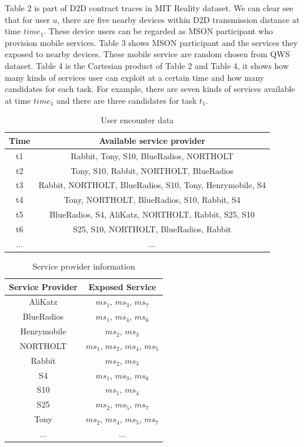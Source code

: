 \documentclass[10pt,journal,compsoc]{IEEEtran}
\begin{document}
Table 2 is part of D2D contract traces in MIT Reality dataset. We can clear see that for user $u$, there are five nearby devices within D2D transmission distance at time $time_1$. These device users can be regarded as MSON participant who provision mobile services. Table 3 shows MSON participant and the services they exposed to nearby devices. These mobile service are random chosen from QWS dataset. Table 4 is the Cartesian product of Table 2 and Table 4, it shows how many kinds of services user can exploit at a certain time and how many candidates for each task. For example, there are seven kinds of services available at time $time_1$ and there are three candidates for task $t_1$.

\begin{table}[!t]
\renewcommand{\arraystretch}{1.3}
\caption{User encounter data}
\label{table_example}
\centering
\begin{tabular}{c c}
\hline
\bfseries Time & \bfseries Available service provider\\
\hline
t1 & Rabbit, Tony, S10, BlueRadios, NORTHOLT\\
t2 & Tony, S10, Rabbit, NORTHOLT, BlueRadios\\
t3 & Rabbit, NORTHOLT, BlueRadios, S10, Tony, Henrymobile, S4 \\
t4 & Tony, NORTHOLT, BlueRadios, S10, Rabbit, S4\\
t5 & BlueRadios, S4, AliKatz, NORTHOLT, Rabbit, S25, S10\\
t6 & S25, S10, NORTHOLT, BlueRadios, Rabbit\\
... & ...\\
\hline
\end{tabular}
\end{table}

\begin{table}[!t]
\renewcommand{\arraystretch}{1.3}
\caption{Service provider information}
\label{table_example}
\centering
\begin{tabular}{c c}
\hline
\bfseries Service Provider & \bfseries Exposed Service\\
\hline
AliKatz     & $ms_1$, $ms_3$, $ms_7$\\
BlueRadios  & $ms_1$, $ms_4$, $ms_6$\\
Henrymobile & $ms_2$, $ms_3$\\
NORTHOLT    & $ms_1$, $ms_2$, $ms_4$, $ms_5$ \\
Rabbit      & $ms_2$, $ms_3$\\
S4          & $ms_1$, $ms_3$, $ms_6$\\
S10         & $ms_1$, $ms_4$\\
S25         & $ms_2$, $ms_5$, $ms_7$\\
Tony        & $ms_2$, $ms_4$, $ms_5$, $ms_7$\\
... & ...\\
\hline
\end{tabular}
\end{table}
\end{document}
